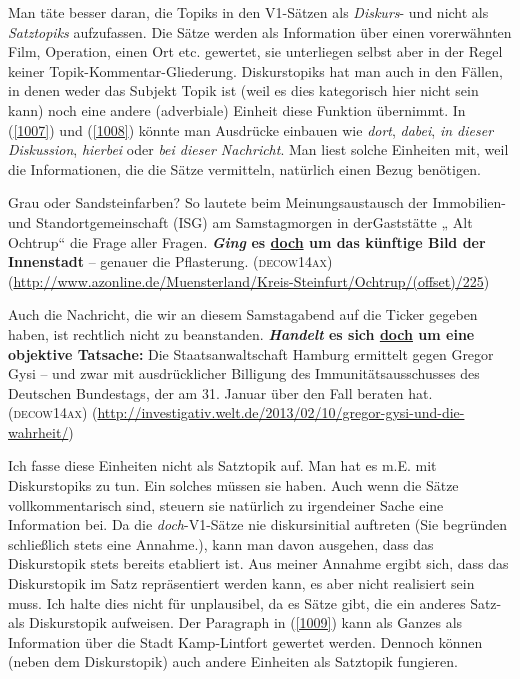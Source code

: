 Man täte besser daran, die Topiks in den V1-Sätzen als \textit{Diskurs}- und  nicht als \textit{Satztopiks} aufzufassen. Die Sätze werden als Information über einen vorerwähn\-ten Film, Operation, einen Ort etc. gewertet, sie unterliegen selbst aber in der Regel keiner Topik-Kommentar-Gliederung. Diskurstopiks hat man auch in den Fällen, in denen weder das Subjekt Topik ist (weil es dies kategorisch hier nicht sein kann) noch eine andere (adverbiale) Einheit diese Funktion übernimmt. In (\ref{1007}) und (\ref{1008}) könnte man Ausdrücke einbauen wie \textit{dort}, \textit{dabei}, \textit{in dieser Diskussion}, \textit{hierbei} oder \textit{bei dieser Nachricht}. Man liest solche Einheiten mit, weil die Informationen, die die Sätze vermitteln, natürlich einen Bezug benötigen.

\begin{exe}
	\ex\label{1007} 

	Grau oder Sandsteinfarben? So lautete beim Meinungsaustausch der Im\-mo\-bi\-li\-en- und Standortgemeinschaft (ISG) am Samstagmorgen in der\linebreak Gaststätte „		Alt Ochtrup“ die Frage aller Fragen. \textbf{\textit{Ging} es \ul{doch} um das künftige Bild der Innenstadt} – genauer die Pflasterung.   		\hfill\hbox{\scshape(decow14ax)}
	\newline
	{\scriptsize(\url{http://www.azonline.de/Muensterland/Kreis-Steinfurt/Ochtrup/(offset)/225})}
\end{exe}	

\begin{exe}
	\ex\label{1008} 

	Auch die Nachricht, die wir an diesem Samstagabend auf die Ticker gegeben haben, ist rechtlich nicht zu beanstanden. \textbf{\textit{Handelt} es sich 		\ul{doch} um eine objektive Tatsache:} Die Staatsanwaltschaft Hamburg ermittelt gegen Gregor Gysi – und zwar mit ausdrücklicher Billigung des 		Immunitätsausschusses des Deutschen Bundestags, der am 31. Januar über den Fall beraten hat.    		
	\hfill\hbox{\scshape(decow14ax)}
	\newline
	{\scriptsize(\url{http://investigativ.welt.de/2013/02/10/gregor-gysi-und-die-wahrheit/})}
\end{exe}	
Ich fasse diese Einheiten nicht als Satztopik  auf. Man hat es m.E. mit Diskurstopiks  zu tun. Ein solches müssen sie haben. Auch wenn die Sätze vollkommentarisch sind, steuern sie natürlich zu irgendeiner Sache eine Information bei. Da die \textit{doch}-V1-Sätze nie diskursinitial auftreten (Sie begründen schließlich stets eine Annahme.), kann man davon ausgehen, dass das Diskurstopik stets bereits etabliert ist. Aus meiner Annahme ergibt sich, dass das Diskurstopik im Satz repräsentiert werden kann, es aber nicht realisiert sein muss. Ich halte dies nicht für unplausibel, da es Sätze gibt, die ein anderes Satz- als Diskurstopik aufweisen. Der Paragraph in (\ref{1009}) kann als Ganzes als Information über die Stadt Kamp-Lintfort gewertet werden. Dennoch können (neben dem Diskurstopik) auch andere Einheiten als Satztopik fungieren.

